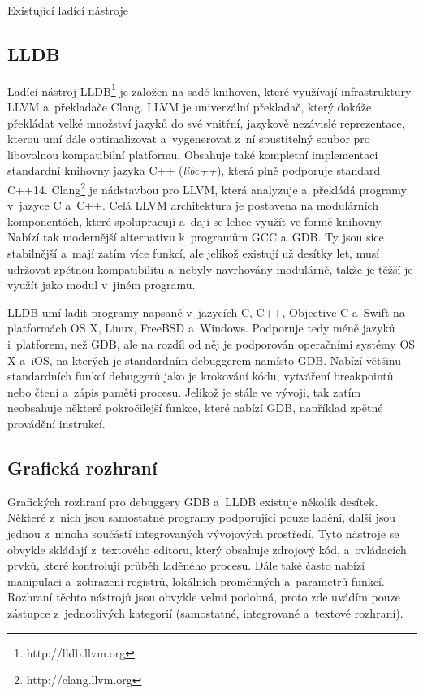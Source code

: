 \documentclass[czech,bachelor,male,python,dept460,hidelinks]{diploma}						%
\newcommand{\parspace}[1][]{
	\ifthenelse{\isempty{#1}}{\vspace{0mm}}{\vspace{#1}}
	\par
}
\begin{document}
\begin{section}{Existující ladící nástroje}
	\subsection{LLDB}
		Ladící nástroj LLDB\footnote{http://lldb.llvm.org} je založen na sadě knihoven, které využívají infrastruktury LLVM a~překladače Clang.
		LLVM je univerzální překladač, který dokáže překládat velké množství jazyků do své vnitřní, jazykově nezávislé reprezentace, kterou umí dále
		optimalizovat a~vygenerovat z~ní spustitelný soubor pro libovolnou kompatibilní platformu. Obsahuje také kompletní implementaci standardní
		knihovny jazyka C++ (\textit{libc++}), která plně podporuje standard C++14. Clang\footnote{http://clang.llvm.org} je nádstavbou pro LLVM, která analyzuje
		a~překládá programy v~jazyce C a~C++. Celá LLVM architektura je postavena na modulárních komponentách, které spolupracují a~dají se lehce využít ve
		formě knihovny. Nabízí tak modernější alternativu k~programům GCC a~GDB. Ty jsou sice stabilnější a~mají zatím více funkcí, ale jelikož existují už
		desítky let, musí udržovat zpětnou kompatibilitu a~nebyly navrhovány modulárně, takže je těžší je využít jako modul v~jiném programu.
		
		\parspace LLDB umí ladit programy napsané v~jazycích C, C++, Objective-C a~Swift na platformách OS X, Linux, FreeBSD a~Windows. Podporuje tedy méně jazyků
		i~platforem, než GDB, ale na rozdíl od něj je podporován operačními systémy OS X a~iOS, na kterých je standardním debuggerem namísto GDB.
		Nabízí většinu standardních funkcí debuggerů jako je krokování kódu, vytváření breakpointů nebo čtení a~zápis paměti procesu.
		Jelikož je stále ve vývoji, tak zatím neobsahuje některé pokročilejší funkce, které nabízí GDB, například zpětné provádění instrukcí.

	\subsection{Grafická rozhraní}
		Grafických rozhraní pro debuggery GDB a~LLDB existuje několik desítek. \cite{gdb-mi-usage} Některé z~nich jsou samostatné programy podporující pouze
		ladění, další jsou jednou z~mnoha součástí integrovaných vývojových prostředí. Tyto nástroje se obvykle skládají z~textového editoru,
		který obsahuje zdrojový kód, a~ovládacích prvků, které kontrolují průběh laděného procesu. Dále také často nabízí manipulaci a~zobrazení registrů,
		lokálních proměnných a~parametrů funkcí. Rozhraní těchto nástrojů jsou obvykle velmi podobná, proto zde uvádím pouze zástupce z~jednotlivých kategorií
		(samostatné, integrované a~textové rozhraní).


\end{section}
\end{document}
